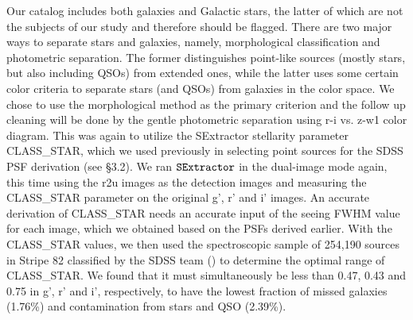 \documentclass[apj,iop]{emulateapj}
\begin{document}
Our catalog includes both galaxies and Galactic stars, the latter of which are not the subjects of our study and therefore should be flagged. There are two major ways to separate stars and galaxies, namely, morphological classification and photometric separation. The former distinguishes point-like sources (mostly stars, but also including QSOs) from extended ones, while the latter uses some certain color criteria to separate stars (and QSOs) from galaxies in the color space. We chose to use the morphological method as the primary criterion and the follow up cleaning will be done by the gentle photometric separation using r-i vs. z-w1 color diagram.
%
This was again to utilize the SExtractor stellarity parameter CLASS\_STAR, which we used previously in selecting point sources for the SDSS PSF derivation (see \S 3.2). We ran $\tt SExtractor$ in the dual-image mode again, this time using the r2u images as the detection images and measuring the CLASS\_STAR parameter on the  original g’, r’ and i’ images. An accurate derivation of CLASS\_STAR needs an accurate input of the seeing FWHM value for each image, which we obtained based on the PSFs derived earlier. With the CLASS\_STAR values, we then used the spectroscopic sample of 254,190 sources in Stripe 82 classified by the SDSS team (\citet{Bolton2012a}) to determine the optimal range of CLASS\_STAR. We found that it must simultaneously be less than 0.47, 0.43 and 0.75 in g’, r’ and i’, respectively, to have the lowest fraction of missed galaxies (1.76\%) and contamination from stars and QSO (2.39\%).

\end{document}

